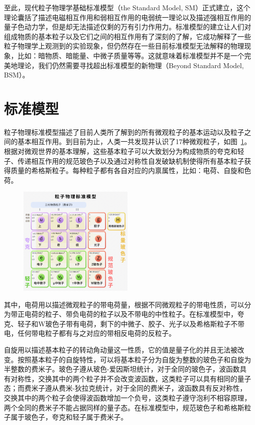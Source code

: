 至此，现代粒子物理学基础标准模型（the Standard Model, SM）正式建立，这个理论囊括了描述电磁相互作用和弱相互作用的电弱统一理论以及描述强相互作用的量子色动力学，但是却无法描述仅剩的万有引力作用力。标准模型的建立让人们对组成物质的基本粒子以及它们之间的相互作用有了深刻的了解，它成功解释了一些粒子物理学上观测到的实验现象，但仍然存在一些目前标准模型无法解释的物理现象，比如：暗物质、暗能量、中微子质量等等。这就意味着标准模型并不是一个完美地理论，我们仍然需要寻找超出标准模型的新物理（Beyond Standard Model, BSM）。

\section{标准模型}

粒子物理标准模型描述了目前人类所了解到的所有微观粒子的基本运动以及粒子之间的基本相互作用。到目前为止，人类一共发现并认识了17种微观粒子，如图~\ref{fig:c01f01}。根据对微观世界的基本理解，这些基本粒子可以大致划分为构成物质的夸克和轻子、传递相互作用的规范玻色子以及通过对称性自发破缺机制使得所有基本粒子获得质量的希格斯粒子。每种粒子都有各自对应的内禀属性，比如：电荷、自旋和色荷。

\begin{figure}[!htbp]
    \centering
    \includegraphics[width=0.50\textwidth]{figures/chapter01/SM.jpg}
    \label{fig:c01f01}
\end{figure}

其中，电荷用以描述微观粒子的带电荷量，根据不同微观粒子的带电性质，可以分为带正电荷的粒子、带负电荷的粒子以及不带电的中性粒子。在标准模型中，夸克、轻子和W玻色子带有电荷，剩下的中微子、胶子、光子以及希格斯粒子不带电，任何带电粒子都有与之对应的带相反电荷的反粒子。

自旋用以描述基本粒子的转动角动量这一性质，它的值是量子化的并且无法被改变。按照基本粒子的自旋特性，可以将基本粒子分为自旋为整数的玻色子和自旋为半整数的费米子。玻色子遵从玻色-爱因斯坦统计，对于全同的玻色子，波函数具有对称性，交换其中的两个粒子并不会改变波函数，这类粒子可以具有相同的量子态；而费米子遵从费米-狄拉克统计，对于全同的费米子，波函数具有反对称性，交换其中的两个粒子会使得波函数增加一个负号，这类粒子遵守泡利不相容原理，两个全同的费米子不能占据同样的量子态。在标准模型中，规范玻色子和希格斯粒子属于玻色子，夸克和轻子属于费米子。

